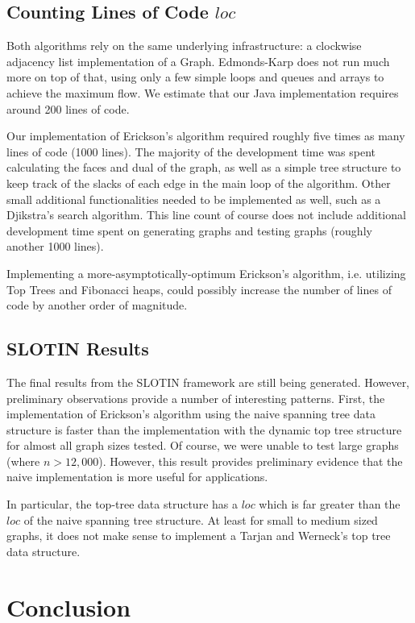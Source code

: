 \documentclass[12pt]{article}
\begin{document}
\subsection{Counting Lines of Code $loc$}

Both algorithms rely on the same underlying infrastructure: a clockwise adjacency list implementation of a Graph.  Edmonds-Karp does not run much more on top of that, using only a few simple loops and queues and arrays to achieve the maximum flow.  We estimate that our Java implementation requires around 200 lines of code.

Our implementation of Erickson's algorithm required roughly five times as many lines of code (1000 lines).  The majority of the development time was spent calculating the faces and dual of the graph, as well as a simple tree structure to keep track of the slacks of each edge in the main loop of the algorithm.  Other small additional functionalities needed to be implemented as well, such as a Djikstra's search algorithm.  This line count of course does not include additional development time spent on generating graphs and testing graphs (roughly another 1000 lines).

Implementing a more-asymptotically-optimum Erickson's algorithm, i.e. utilizing Top Trees and Fibonacci heaps, could possibly increase the number of lines of code by another order of magnitude.

\subsection{SLOTIN Results}

The final results from the SLOTIN framework are still being generated. However, preliminary observations provide a number of interesting patterns. First, the implementation of Erickson's algorithm using the naive spanning tree data structure is faster than the implementation with the dynamic top tree structure for almost all graph sizes tested. Of course, we were unable to test large graphs (where $n > 12,000$). However, this result provides preliminary evidence that the naive implementation is more useful for applications. 

In particular, the top-tree data structure has a $loc$ which is far greater than the $loc$ of the naive spanning tree structure. At least for small to medium sized graphs, it does not make sense to implement a Tarjan and Werneck's top tree data structure.

\section{Conclusion}
\end{document}
